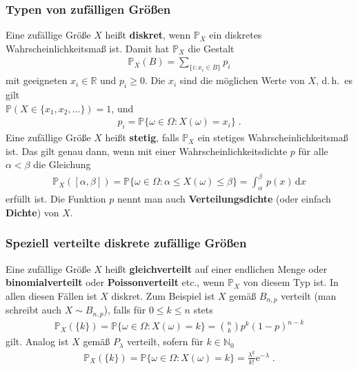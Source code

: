 \documentclass[ngerman,draft,parskip=half,twoside]{scrartcl}
\newcommand*{\R}{\mathbb{R}}      %
\newcommand*{\N}{\mathbb{N}}      %
\newcommand*{\WKM}{\mathbb{P}}      %
\begin{document}
\subsubsection{Typen von zufälligen Größen}
Eine zufällige Größe $X$ heißt \textbf{diskret}, wenn $\WKM_X$ ein diskretes
Wahrscheinlichkeitsmaß ist. Damit hat $\WKM_X$ die Gestalt
\begin{gather*}
  \WKM_X(B)=\sum_{\{i\colon x_i\in  B\}} p_i
\end{gather*}
mit geeigneten $x_i\in\R$ und $p_i\ge 0$. Die $x_i$ sind die möglichen Werte von $X$, d.\,h.~es
gilt\\ $\WKM(X\in\{x_1,x_2,\ldots\})=1$,
und
\begin{gather*}
  p_i=\WKM\{\omega\in\Omega \colon X(\omega)=x_i\}\;.
\end{gather*}
Eine zufällige Größe $X$ heißt \textbf{stetig}, falls $\WKM_X$ ein stetiges Wahrscheinlichkeitsmaß
ist. Das gilt genau dann, wenn mit einer Wahrscheinlichkeitsdichte $p$ für alle $\alpha<\beta$
die Gleichung
\begin{gather*}
  \WKM_X([\alpha,\beta])=\WKM\{\omega\in\Omega \colon \alpha\le X(\omega)\le\beta\}=\int_\alpha^\beta\,p(x)\,
     \mathrm d x
\end{gather*}
erfüllt ist. Die Funktion $p$ nennt man auch \textbf{Verteilungsdichte} (oder einfach
\textbf{Dichte}) von $X$.
\subsubsection{Speziell verteilte diskrete zufällige Größen}
Eine zufällige Größe $X$ heißt \textbf{gleichverteilt}
 auf einer endlichen Menge oder \textbf{binomialverteilt}
oder \textbf{Poissonverteilt} etc., wenn $\WKM_X$ von diesem Typ ist. In allen diesen Fällen
ist $X$ diskret. Zum Beispiel ist $X$ gemäß $B_{n,p}$ verteilt (man schreibt auch
$X\sim B_{n,p}$), falls für $0\le k\le n$ stets
\begin{gather*}
  \WKM_X(\{k\})=\WKM\{\omega\in\Omega \colon X(\omega)=k\} = {n \choose k} p^k(1-p)^{n-k}
\end{gather*}
gilt. Analog ist $X$ gemäß $P_\lambda$ verteilt, sofern für $k\in\N_0$
\begin{gather*}
  \WKM_X(\{k\})=\WKM\{\omega\in\Omega \colon X(\omega)=k\}=\frac{\lambda^k}{k!}\mathrm e^{-\lambda}\;.
\end{gather*}
\end{document}
